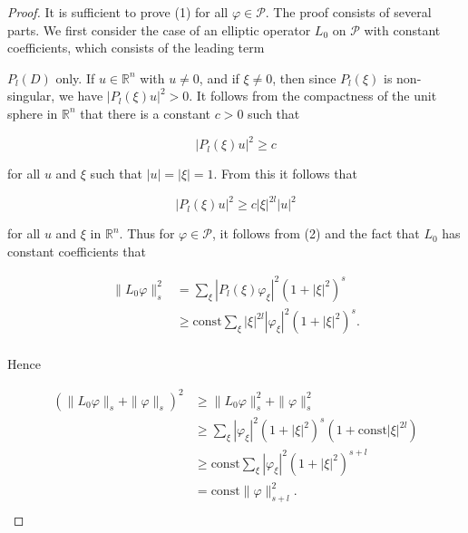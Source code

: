\begin{proof}
It is sufficient to prove (1) for all $\varphi \in \mathcal{P}$. The proof consists of several parts. We first consider the case of an elliptic operator $L_0$ on $\mathcal{P}$ with constant coefficients, which consists of the leading term

$P_l(D)$ only. If $u \in \mathbb{R}^n$ with $u \neq 0$, and if $\xi \neq 0$, then since $P_l(\xi)$ is non-singular, we have $|P_l(\xi)u|^2 > 0$. It follows from the compactness of the unit sphere in $\mathbb{R}^n$ that there is a constant $c > 0$ such that

\[
|P_{l}(\xi)u|^{2}\geq c
\]

for all  $ u $ and  $ \xi $ such that  $ |u| = |\xi| = 1 $. From this it follows that

\begin{equation}
\tag{2}\label{eq:6.29:2}
|P_{l}(\xi)u|^{2}\geq c|\xi|^{2l}|u|^{2}
\end{equation}

for all $u$ and $\xi$ in $\mathbb{R}^n$. Thus for $\varphi \in \mathcal{P}$, it follows from (2) and the fact that $L_0$ has constant coefficients that

\begin{equation}
\tag{3}\label{eq:6.29:3}
\begin{aligned}{\|L_{0}\varphi\|_{s}^{2}}&{{}=\sum_{\xi}|P_{l}(\xi)\varphi_{\xi}|^{2}\left(1+|\xi|^{2}\right)^{s}}\\ {}&{{}\geq\mathrm{const}\sum_{\xi}|\xi|^{2l}|\varphi_{\xi}|^{2}(1+|\xi|^{2})^{s}.}\\ \end{aligned}
\end{equation}

Hence


\begin{equation}
\tag{4}\label{eq:6.29:4}
\begin{aligned}{(\|L_{0}\varphi\|_{s}+\|\varphi\|_{s})^{2}}&{{}\geq\|L_{0}\varphi\|_{s}^{2}+\|\varphi\|_{s}^{2}}\\ {}&{{}\geq\sum_{\xi}|\varphi_{\xi}|^{2}(1+|\xi|^{2})^{s}(1+\mathrm{const}|\xi|^{2l})}\\ {}&{{}\geq\mathrm{const}\sum_{\xi}|\varphi_{\xi}|^{2}(1+|\xi|^{2})^{s+l}}\\ {}&{{}=\mathrm{const}\|\varphi\|_{s+l}^{2}.}\\ \end{aligned}
\end{equation}


\end{proof}
